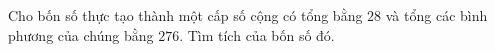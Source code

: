\begin{ex}
Cho bốn số thực tạo thành một cấp số cộng có tổng bằng $28$ và tổng các bình phương của chúng bằng $276$. Tìm tích của bốn số đó.
\end{ex}
